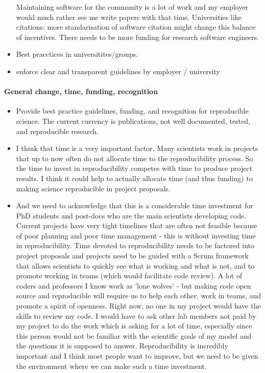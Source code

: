 \documentclass{article}
\begin{document}
\begin{itemize}
Maintaining software for the community is a lot of work and my employer would much rather see me write papers with that time. 
Universities like citations: more standarisation of software citation might change this balance of incentives. 
There needs to be more funding for research software engineers.
	\item Best pracctices in universitites/groups.
	\item enforce clear and transparent guidelines by employer / university
\end{itemize}

\paragraph{General change, time, funding, recognition}
\begin{itemize}
	\item Provide best practice guidelines, funding, and recognition for reproducible science. The current currency is publications, not well documented, tested, and reproducible research.
	\item I think that time is a very important factor. Many scientists work in projects that up to now often do not allocate time to the reproducibility process. So the time to invest in reproducibility competes with time to produce project results. I think it could help to actually allocate time (and thus funding) to making science reproducible in project proposals.
	\item And we need to acknowledge that this is a considerable time investment for PhD students and post-docs who are the main scientists developing code. Current projects have very tight timelines that are often not feasible because of poor planning and poor time management - this is without investing time in reproducibility. Time devoted to reproducibility needs to be factored into project proposals and projects need to be guided with a Scrum framework that allows scientists to quickly see what is working and what is not, and to promote working in teams (which would facilitate code review). A lot of coders and professors I know work as 'lone wolves' - but making code open source and reproducible will require us to help each other, work in teams, and promote a spirit of openness. Right now, no one in my project would have the skills to review my code. I would have to ask other lab members not paid by my project to do the work which is asking for a lot of time, especially since this person would not be familiar with the scientific goals of my model and the questions it is supposed to answer. Reproducibility is incredibly important and I think most people want to improve, but we need to be given the environment where we can make such a time investment. 

\end{itemize}
\end{document}
